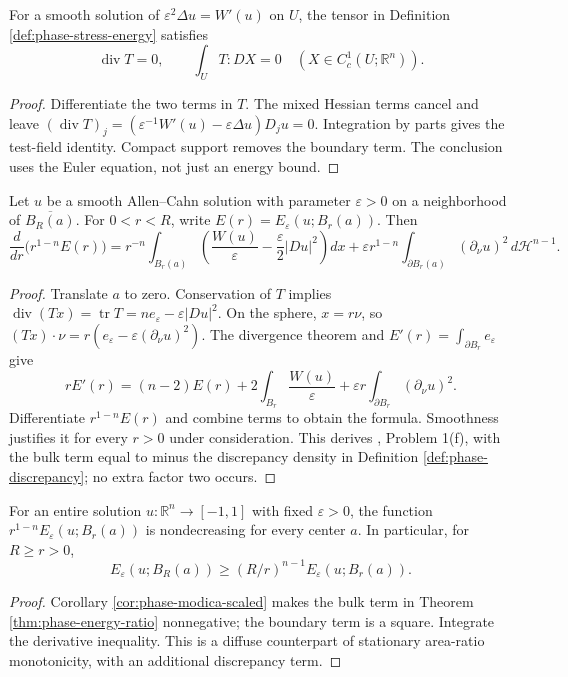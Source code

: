 \begin{proposition}\label{prop:phase-stress-conservation}
For a smooth solution of $\varepsilon^2\Delta u=W'(u)$ on $U$, the tensor in Definition \ref{def:phase-stress-energy} satisfies
\[
 \operatorname{div}T=0,\qquad
 \int_U T:DX=0\quad(X\in C_c^1(U;\mathbb R^n)).
\]
\end{proposition}
\begin{proof}
Differentiate the two terms in $T$. The mixed Hessian terms cancel and leave
$(\operatorname{div}T)_j=(\varepsilon^{-1}W'(u)-\varepsilon\Delta u)D_j u=0$.
Integration by parts gives the test-field identity. Compact support removes the boundary term. The conclusion uses the Euler equation, not just an energy bound.
\end{proof}

\begin{theorem}\label{thm:phase-energy-ratio}
Let $u$ be a smooth Allen--Cahn solution with parameter $\varepsilon>0$ on a neighborhood of $\overline{B_R(a)}$. For $0<r<R$, write $E(r)=E_\varepsilon(u;B_r(a))$. Then
\[
 \frac d{dr}\bigl(r^{1-n}E(r)\bigr)
 =r^{-n}\int_{B_r(a)}\left(\frac{W(u)}\varepsilon-\frac\varepsilon2|Du|^2\right)dx
 +\varepsilon r^{1-n}\int_{\partial B_r(a)}(\partial_\nu u)^2\,d\mathcal H^{n-1}.
\]
\end{theorem}
\begin{proof}
Translate $a$ to zero. Conservation of $T$ implies $\operatorname{div}(Tx)=\operatorname{tr}T=ne_\varepsilon-\varepsilon|Du|^2$. On the sphere, $x=r\nu$, so $(Tx)\cdot\nu=r(e_\varepsilon-\varepsilon(\partial_\nu u)^2)$. The divergence theorem and $E'(r)=\int_{\partial B_r}e_\varepsilon$ give
\[
 rE'(r)=(n-2)E(r)+2\int_{B_r}\frac{W(u)}\varepsilon
 +\varepsilon r\int_{\partial B_r}(\partial_\nu u)^2.
\]
Differentiate $r^{1-n}E(r)$ and combine terms to obtain the formula. Smoothness justifies it for every $r>0$ under consideration. This derives \cite{ChAC}, Problem 1(f), with the bulk term equal to minus the discrepancy density in Definition \ref{def:phase-discrepancy}; no extra factor two occurs.
\end{proof}

\begin{corollary}\label{cor:phase-energy-monotonicity}
For an entire solution $u:\mathbb R^n\to[-1,1]$ with fixed $\varepsilon>0$, the function $r^{1-n}E_\varepsilon(u;B_r(a))$ is nondecreasing for every center $a$. In particular, for $R\geq r>0$,
\[
 E_\varepsilon(u;B_R(a))\geq (R/r)^{n-1}E_\varepsilon(u;B_r(a)).
\]
\end{corollary}
\begin{proof}
Corollary \ref{cor:phase-modica-scaled} makes the bulk term in Theorem \ref{thm:phase-energy-ratio} nonnegative; the boundary term is a square. Integrate the derivative inequality. This is a diffuse counterpart of stationary area-ratio monotonicity, with an additional discrepancy term.
\end{proof}

